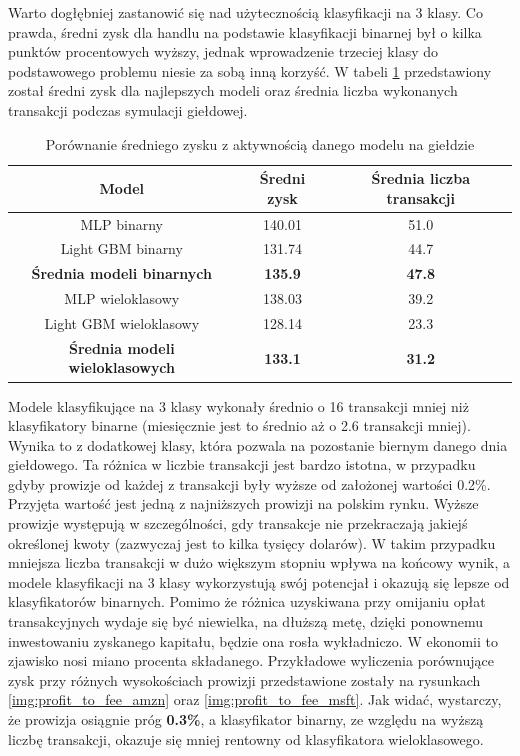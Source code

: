 \documentclass[a4paper, twoside, 11pt, openright]{article}
\begin{document}
Warto dogłębniej zastanowić się nad użytecznością klasyfikacji na 3 klasy. Co prawda, średni zysk dla handlu na podstawie klasyfikacji binarnej był o kilka punktów procentowych wyższy, jednak wprowadzenie trzeciej klasy do podstawowego problemu niesie za sobą inną korzyść. W tabeli \ref{tab:simulation_avg_value_vs_transactions} przedstawiony został średni zysk dla najlepszych modeli oraz średnia liczba wykonanych transakcji podczas symulacji giełdowej.

 \begin{table}[H]
    \centering
    \begin{tabular}{|c|c|c|}
    \hline
        \textbf{Model}  & \textbf{Średni zysk} & \textbf{Średnia liczba transakcji}\\ \hline
            MLP binarny & 140.01 & 51.0 \\ \hline
            Light GBM binarny & 131.74 & 44.7 \\ \hline 
            \textbf{Średnia modeli binarnych} & \textbf{135.9} & \textbf{47.8} \\ \hline \hline
            
            MLP wieloklasowy & 138.03 & 39.2 \\ \hline
            Light GBM wieloklasowy & 128.14 & 23.3 \\ \hline
            \textbf{Średnia modeli wieloklasowych} & \textbf{133.1} & \textbf{31.2} \\ \hline
    \end{tabular}
    \caption{Porównanie średniego zysku z aktywnością danego modelu na giełdzie}
    \label{tab:simulation_avg_value_vs_transactions}
\end{table} 

 Modele klasyfikujące na 3 klasy wykonały średnio o 16 transakcji mniej niż klasyfikatory binarne (miesięcznie jest to średnio aż o 2.6 transakcji mniej). Wynika to z dodatkowej klasy, która pozwala na pozostanie biernym danego dnia giełdowego. Ta różnica w liczbie transakcji jest bardzo istotna, w przypadku gdyby prowizje od każdej z transakcji były wyższe od założonej wartości 0.2\%. Przyjęta wartość jest jedną z najniższych prowizji na polskim rynku. Wyższe prowizje występują w szczególności, gdy transakcje nie przekraczają jakiejś określonej kwoty (zazwyczaj jest to kilka tysięcy dolarów). W takim przypadku mniejsza liczba transakcji w dużo większym stopniu wpływa na końcowy wynik, a modele klasyfikacji na 3 klasy wykorzystują swój potencjał i okazują się lepsze od klasyfikatorów binarnych. Pomimo że różnica uzyskiwana przy omijaniu opłat transakcyjnych wydaje się być niewielka, na dłuższą metę, dzięki ponownemu inwestowaniu zyskanego kapitału, będzie ona rosła wykładniczo. W ekonomii to zjawisko nosi miano procenta składanego. Przykładowe wyliczenia porównujące zysk przy różnych wysokościach prowizji przedstawione zostały na rysunkach \ref{img:profit_to_fee_amzn} oraz \ref{img:profit_to_fee_msft}. Jak widać, wystarczy, że prowizja osiągnie próg \textbf{0.3\%}, a klasyfikator binarny, ze względu na wyższą liczbę transakcji, okazuje się mniej rentowny od klasyfikatora wieloklasowego.
 
\end{document}
